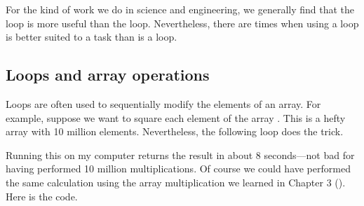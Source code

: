 \documentclass[letterpaper,10pt,english]{sphinxmanual}
\begin{document}
\sphinxAtStartPar
For the kind of work we do in science and engineering, we generally find that the  loop is more useful than the  loop.  Nevertheless, there are times when using a  loop is better suited to a task than is a  loop.


\subsection{Loops and array operations}
\label{\detokenize{chap6/chap6_loopsconds:loops-and-array-operations}}
\sphinxAtStartPar
Loops are often used to sequentially modify the elements of an array.  For example, suppose we want to square each element of the array .  This is a hefty array with 10 million elements.  Nevertheless, the following loop does the trick.

\begin{sphinxVerbatim}[commandchars=\\\{\},numbers=left,firstnumber=1,stepnumber=1]
   
    
   
    \PYG{p}{[}\PYG{p}{]}  \PYG{p}{[}\PYG{p}{]}\PYG{p}{[}\PYG{p}{]}
\end{sphinxVerbatim}

\sphinxAtStartPar
Running this on my computer returns the result in about 8 seconds—not bad for having performed 10 million multiplications.  Of course we could have performed the same calculation using the array multiplication we learned in Chapter 3 ({\hyperref[\detokenize{chap3/chap3_arrays:chap3}]{}}).  Here is the code.

\begin{sphinxVerbatim}[commandchars=\\\{\},numbers=left,firstnumber=1,stepnumber=1]
   
    
  
\end{sphinxVerbatim}
\end{document}
